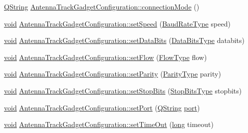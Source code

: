 \begin{DoxyCompactItemize}
\item 
\hyperlink{group___u_a_v_objects_plugin_gab9d252f49c333c94a72f97ce3105a32d}{Q\-String} \hyperlink{group___antenna_track_gadget_plugin_ga016616d69e43834c0b010babbbb20b04}{Antenna\-Track\-Gadget\-Configuration\-::connection\-Mode} ()
\item 
\hyperlink{group___u_a_v_objects_plugin_ga444cf2ff3f0ecbe028adce838d373f5c}{void} \hyperlink{group___antenna_track_gadget_plugin_ga657a8ae2f677f817ea6378959145290c}{Antenna\-Track\-Gadget\-Configuration\-::set\-Speed} (\hyperlink{qextserialport_8h_a6f031169a6a9b150b5af707bb23cf010}{Baud\-Rate\-Type} speed)
\item 
\hyperlink{group___u_a_v_objects_plugin_ga444cf2ff3f0ecbe028adce838d373f5c}{void} \hyperlink{group___antenna_track_gadget_plugin_ga36f5c3e37039cfa6f3ea79d53339db3f}{Antenna\-Track\-Gadget\-Configuration\-::set\-Data\-Bits} (\hyperlink{qextserialport_8h_a189ef78c2c1b7537ab114d576f6214fa}{Data\-Bits\-Type} databits)
\item 
\hyperlink{group___u_a_v_objects_plugin_ga444cf2ff3f0ecbe028adce838d373f5c}{void} \hyperlink{group___antenna_track_gadget_plugin_gab8a02ca68afcbac2db3db1df1f777695}{Antenna\-Track\-Gadget\-Configuration\-::set\-Flow} (\hyperlink{qextserialport_8h_a02ad1c7cf791a069dd54e409f8db4790}{Flow\-Type} flow)
\item 
\hyperlink{group___u_a_v_objects_plugin_ga444cf2ff3f0ecbe028adce838d373f5c}{void} \hyperlink{group___antenna_track_gadget_plugin_gae386222c5ab2b4132f1f09afd058f48f}{Antenna\-Track\-Gadget\-Configuration\-::set\-Parity} (\hyperlink{qextserialport_8h_aee22d32d87c815090354bf9b8e957ace}{Parity\-Type} parity)
\item 
\hyperlink{group___u_a_v_objects_plugin_ga444cf2ff3f0ecbe028adce838d373f5c}{void} \hyperlink{group___antenna_track_gadget_plugin_ga35eed481804afdc5eaff1273278718f2}{Antenna\-Track\-Gadget\-Configuration\-::set\-Stop\-Bits} (\hyperlink{qextserialport_8h_adc8078895cd941d755d46633b54d3e7f}{Stop\-Bits\-Type} stopbits)
\item 
\hyperlink{group___u_a_v_objects_plugin_ga444cf2ff3f0ecbe028adce838d373f5c}{void} \hyperlink{group___antenna_track_gadget_plugin_gac2bdc7b975f53784d49e7d2bb484742e}{Antenna\-Track\-Gadget\-Configuration\-::set\-Port} (\hyperlink{group___u_a_v_objects_plugin_gab9d252f49c333c94a72f97ce3105a32d}{Q\-String} \hyperlink{classport}{port})
\item 
\hyperlink{group___u_a_v_objects_plugin_ga444cf2ff3f0ecbe028adce838d373f5c}{void} \hyperlink{group___antenna_track_gadget_plugin_gacf4c8b3c4cbd9235d1e80ddb544194f3}{Antenna\-Track\-Gadget\-Configuration\-::set\-Time\-Out} (\hyperlink{ioapi_8h_a3c7b35ad9dab18b8310343c201f7b27e}{long} timeout)

\end{DoxyCompactItemize}
